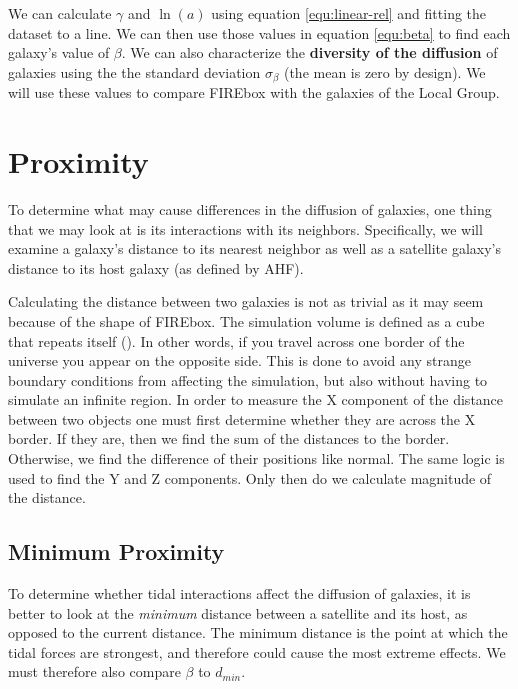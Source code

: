 We can calculate $\gamma$ and $\ln(a)$ using equation \ref{equ:linear-rel} and fitting the dataset to a line. We can then use those values in equation \ref{equ:beta} to find each galaxy's value of $\beta$. We can also characterize the \textbf{diversity of the diffusion} of galaxies using the the standard deviation $\sigma_\beta$ (the mean is zero by design). We will use these values to compare FIREbox with the galaxies of the Local Group.

\section{Proximity}
To determine what may cause differences in the diffusion of galaxies, one thing that we may look at is its interactions with its neighbors. Specifically, we will examine a galaxy's distance to its nearest neighbor as well as a satellite galaxy's distance to its host galaxy (as defined by AHF).

Calculating the distance between two galaxies is not as trivial as it may seem because of the shape of FIREbox. The simulation volume is defined as a cube that repeats itself (\cite{feldmannFIREboxSimulatingGalaxies2022}). In other words, if you travel across one border of the universe you appear on the opposite side. This is done to avoid any strange boundary conditions from affecting the simulation, but also without having to simulate an infinite region. In order to measure the X component of the distance between two objects one must first determine whether they are across the X border. If they are, then we find the sum of the distances to the border. Otherwise, we find the difference of their positions like normal. The same logic is used to find the Y and Z components. Only then do we calculate magnitude of the distance.

\subsection{Minimum Proximity}

To determine whether tidal interactions affect the diffusion of galaxies, it is better to look at the \emph{minimum} distance between a satellite and its host, as opposed to the current distance. The minimum distance is the point at which the tidal forces are strongest, and therefore could cause the most extreme effects. We must therefore also compare $\beta$ to $d_{min}$. 